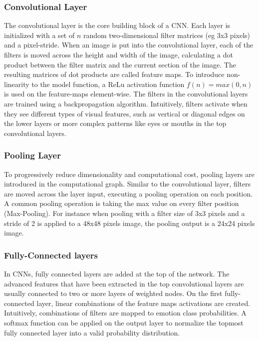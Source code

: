 \documentclass[twoside]{article}
\begin{document}
\begin{multicols}{2}
\subsubsection{Convolutional Layer}
The convolutional layer is the core building block of a CNN. Each layer is initialized with a set of $n$ random two-dimensional filter matrices (eg 3x3 pixels) and a pixel-stride. When an image is put into the convolutional layer, each of the filters is moved across the height and width of the image, calculating a dot product between the filter matrix and the current section of the image. The resulting matrices of dot products are called feature maps. To introduce non-linearity to the model function, a ReLu activation function $f(n) = max(0, n)$ is used on the feature-maps element-wise. The filters in the convolutional layers are trained using a backpropagation algorithm. Intuitively, filters activate when they see different types of visual features, such as vertical or diagonal edges on the lower layers or more complex patterns like eyes or mouths in the top convolutional layers.

\subsubsection{Pooling Layer}
To progressively reduce dimensionality and computational cost, pooling layers are introduced in the computational graph. Similar to the convolutional layer, filters are moved across the layer input, executing a pooling operation on each position. A common pooling operation is taking the max value on every filter position (Max-Pooling). For instance when pooling with a filter size of 3x3 pixels and a stride of 2 is applied to a 48x48 pixels image, the pooling output is a 24x24 pixels image.

\subsubsection{Fully-Connected layers}
In CNNs, fully connected layers are added at the top of the network. The advanced features that have been extracted in the top convolutional layers are usually connected to two or more layers of weighted nodes. On the first fully-connected layer, linear combinations of the feature maps activations are created. Intuitively, combinations of filters are mapped to emotion class probabilities. A softmax function can be applied on the output layer to normalize the topmost fully connected layer into a valid probability distribution.



\end{multicols}
\end{document}

